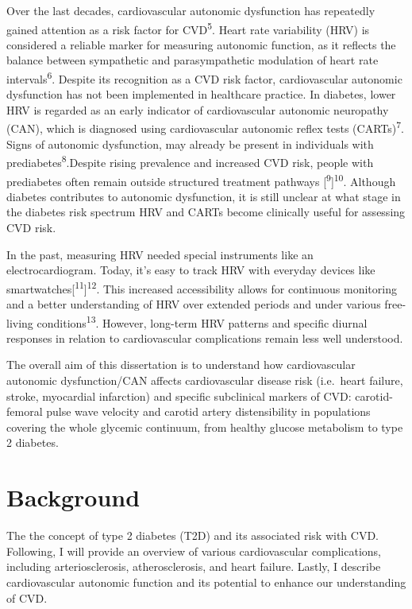\documentclass[
  a4paper,
  headsepline=true,
  open=any]{scrbook}
\begin{document}
Over the last decades, cardiovascular autonomic dysfunction has
repeatedly gained attention as a risk factor for CVD\textsuperscript{5}.
Heart rate variability (HRV) is considered a reliable marker for
measuring autonomic function, as it reflects the balance between
sympathetic and parasympathetic modulation of heart rate
intervals\textsuperscript{6}. Despite its recognition as a CVD risk
factor, cardiovascular autonomic dysfunction has not been implemented in
healthcare practice. In diabetes, lower HRV is regarded as an early
indicator of cardiovascular autonomic neuropathy (CAN), which is
diagnosed using cardiovascular autonomic reflex tests
(CARTs)\textsuperscript{7}. Signs of autonomic dysfunction, may already
be present in individuals with prediabetes\textsuperscript{8}.Despite
rising prevalence and increased CVD risk, people with prediabetes often
remain outside structured treatment pathways
{[}\textsuperscript{9}{]}\textsuperscript{10}. Although diabetes
contributes to autonomic dysfunction, it is still unclear at what stage
in the diabetes risk spectrum HRV and CARTs become clinically useful for
assessing CVD risk.

In the past, measuring HRV needed special instruments like an
electrocardiogram. Today, it's easy to track HRV with everyday devices
like smartwatches{[}\textsuperscript{11}{]}\textsuperscript{12}. This
increased accessibility allows for continuous monitoring and a better
understanding of HRV over extended periods and under various free-living
conditions\textsuperscript{13}. However, long-term HRV patterns and
specific diurnal responses in relation to cardiovascular complications
remain less well understood.

The overall aim of this dissertation is to understand how cardiovascular
autonomic dysfunction/CAN affects cardiovascular disease risk
(i.e.~heart failure, stroke, myocardial infarction) and specific
subclinical markers of CVD: carotid-femoral pulse wave velocity and
carotid artery distensibility in populations covering the whole glycemic
continuum, from healthy glucose metabolism to type 2 diabetes.


\hypertarget{background}{%
\chapter{Background}\label{background}}

The the concept of type 2 diabetes (T2D) and its associated risk with
CVD. Following, I will provide an overview of various cardiovascular
complications, including arteriosclerosis, atherosclerosis, and heart
failure. Lastly, I describe cardiovascular autonomic function and its
potential to enhance our understanding of CVD.
\end{document}

